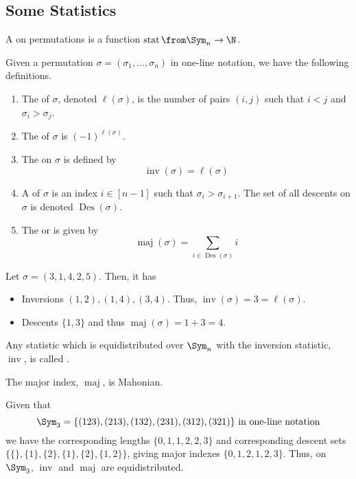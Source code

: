 \documentclass[11pt,leqno,oneside]{amsart}
\numberwithin{thm}{section}
\newcommand{\inv}{\operatorname{inv}}
\newcommand{\stat}{\operatorname{stat}}
\newcommand{\Des}{\operatorname{Des}}
\newcommand{\maj}{\operatorname{maj}}
\begin{document}
\subsection{Some Statistics}
\begin{defn}
  A  on permutations is a function \(\stat \from \Sym_n
  \to \N\). 
\end{defn}
\begin{defn}
  Given a permutation \(\sigma = (\sigma_1,
  \ldots, \sigma_n)\) in one-line notation, we have the following
  definitions. 
  \begin{enumerate}
  \item The  of \(\sigma\), denoted \(\ell(\sigma)\), is
    the number of pairs \((i,j)\) such that \(i < j\) and \(\sigma_i >
    \sigma_j\).
  \item The  of \(\sigma\) is \((-1)^{\ell(\sigma)}\).
  \item The  on \(\sigma\) is defined by \[
      \inv(\sigma) = \ell(\sigma)
    \]
  \item A  of \(\sigma\) is an index \(i \in [n-1]\) such
    that \(\sigma_i > \sigma_{i+1}\). The set of all descents on
    \(\sigma\) is denoted \(\Des(\sigma)\).
  \item The  or  is given by \[
      \maj(\sigma) = \sum_{i \in \Des(\sigma)} i
    \]
  \end{enumerate}
\end{defn}
\begin{example}
  Let \(\sigma = (3,1,4,2,5)\). Then, it has
  \begin{itemize}
  \item Inversions \((1,2), (1,4), (3,4)\). Thus, \(\inv(\sigma) = 3 =
    \ell(\sigma)\).
  \item Descents \(\{1,3\}\) and thus \(\maj(\sigma) = 1+3 = 4\).
  \end{itemize}
\end{example}
\begin{defn}
  Any statistic which is equidistributed over \(\Sym_n\) with the
  inversion statistic, \(\inv\), is called .
\end{defn}
\begin{thm}
  The major index, \(\maj\), is Mahonian.
\end{thm}
\begin{example}
  Given that \[
    \Sym_3 = \{(123),(213),(132),(231),(312),(321)\} \text{ in
      one-line notation}
  \]
  we have the corresponding lengths \(\{0,1,1,2,2,3\}\) and
  corresponding descent sets
  \(\{\{\},\{1\},\{2\},\{1\},\{2\},\{1,2\}\}\), giving major indexes
  \(\{0,1,2,1,2,3\}\). Thus, on \(\Sym_3\), \(\inv\) and \(\maj\) are
  equidistributed. 
\end{example}
\end{document}
